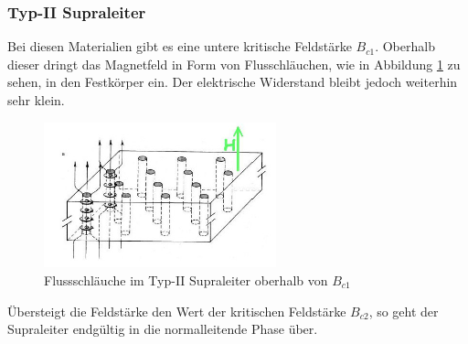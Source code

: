 		\subsubsection{Typ-II Supraleiter}
Bei diesen Materialien gibt es eine untere kritische Feldstärke $B_{c1}$. Oberhalb
dieser dringt das Magnetfeld in Form von Flusschläuchen, wie in Abbildung 
\ref{Abb:flusschlauch} zu sehen, in den Festkörper ein. Der elektrische Widerstand
bleibt jedoch weiterhin sehr klein.
\begin{figure}[h]
	\centering
	\includegraphics[width=0.6\textwidth]{Abb/flussschlauch.jpg}
	\caption{Flussschläuche im Typ-II Supraleiter oberhalb von $B_{c1}$}
	\label{Abb:flusschlauch}
\end{figure}
Übersteigt die Feldstärke den Wert der kritischen Feldstärke $B_{c2}$, so geht
der Supraleiter endgültig in die normalleitende Phase über.

